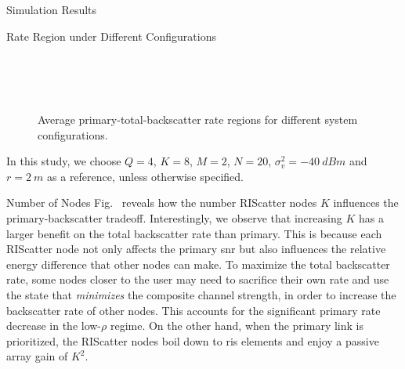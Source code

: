 \documentclass[journal]{IEEEtran}
\begin{document}
\begin{section}{Simulation Results}
	\begin{subsection}{Rate Region under Different Configurations}
		\begin{figure}[!t]
			\centering
			\\
			\\
			\\
			\caption{
				Average primary-total-backscatter rate regions for different system configurations.
			}
			\label{fg:region_config}
		\end{figure}
		In this study, we choose $Q=4$, $K=8$, $M=2$, $N=20$, $\sigma_v^2=\qty{-40}{dBm}$ and $r=\qty{2}{m}$ as a reference, unless otherwise specified.
		\begin{subsubsection}{Number of Nodes}
			Fig.~ reveals how the number RIScatter nodes $K$ influences the primary-backscatter tradeoff.
			Interestingly, we observe that increasing $K$ has a larger benefit on the total backscatter rate than primary.
			This is because each RIScatter node not only affects the primary \gls{snr} but also influences the relative energy difference that other nodes can make.
			To maximize the total backscatter rate, some nodes closer to the user may need to sacrifice their own rate and use the state that \emph{minimizes} the composite channel strength, in order to increase the backscatter rate of other nodes.
			This accounts for the significant primary rate decrease in the low-$\rho$ regime.
			On the other hand, when the primary link is prioritized, the RIScatter nodes boil down to \gls{ris} elements and enjoy a passive array gain of $K^2$.
		\end{subsubsection}


\end{subsection}
\end{section}
\end{document}
